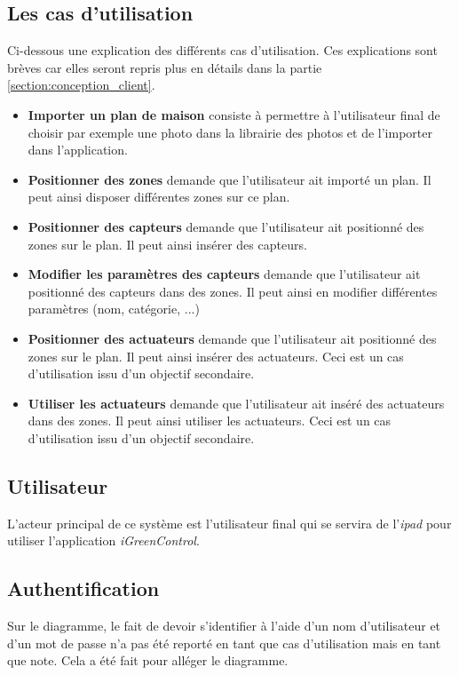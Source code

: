 \subsection{Les cas d'utilisation} %

Ci-dessous une explication des différents cas d'utilisation. Ces explications sont brèves car elles seront repris plus en détails dans la partie \ref{section:conception_client}.

\medskip

\begin{itemize}
	\item \textbf{Importer un  plan de maison} consiste à permettre à l'utilisateur final de choisir par exemple une photo dans la librairie des photos et de l'importer dans l'application. 
	\item \textbf{Positionner des zones} demande que l'utilisateur ait importé un plan. Il peut ainsi disposer différentes zones sur ce plan.
	\item \textbf{Positionner des capteurs} demande que l'utilisateur ait positionné des zones sur le plan. Il peut ainsi insérer des capteurs.
	\item \textbf{Modifier les paramètres des capteurs} demande que l'utilisateur ait positionné des capteurs dans des zones. Il peut ainsi en modifier différentes paramètres (nom, catégorie, ...)
	\item \textbf{Positionner des actuateurs} demande que l'utilisateur ait positionné des zones sur le plan. Il peut ainsi insérer des actuateurs. Ceci est un cas d'utilisation issu d'un objectif secondaire.
	\item \textbf{Utiliser les actuateurs} demande que l'utilisateur ait inséré des actuateurs dans des zones. Il peut ainsi utiliser les actuateurs. Ceci est un cas d'utilisation issu d'un objectif secondaire.
\end{itemize}

\subsection{Utilisateur}

L'acteur principal de ce système est l'utilisateur final qui se servira de l'\emph{\gls{ipad}} pour utiliser l'application \emph{iGreenControl}.

\subsection{Authentification}
Sur le diagramme, le fait de devoir s'identifier à l'aide d'un nom d'utilisateur et d'un mot de passe n'a pas été reporté en tant que cas d'utilisation mais en tant que note. Cela a été fait pour alléger le diagramme. 

